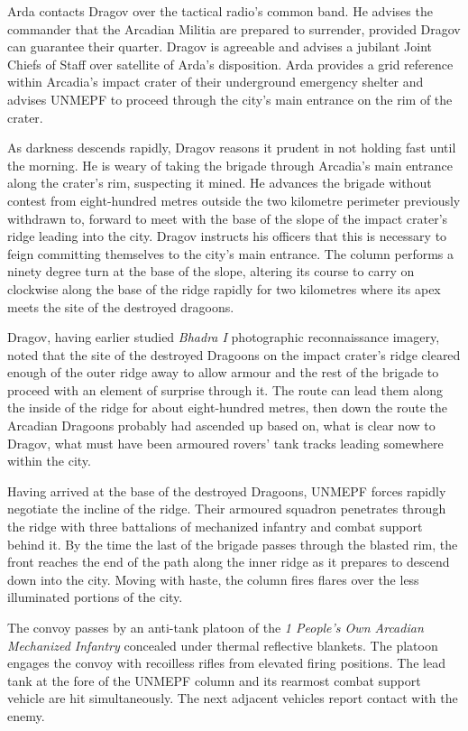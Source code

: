 Arda contacts Dragov over the tactical radio's common band. He advises the commander that the Arcadian Militia are prepared to surrender, provided Dragov can guarantee their quarter. Dragov is agreeable and advises a jubilant Joint Chiefs of Staff over satellite of Arda's disposition. Arda provides a grid reference within Arcadia's impact crater of their underground emergency shelter and advises UNMEPF to proceed through the city's main entrance on the rim of the crater. 

As darkness descends rapidly, Dragov reasons it prudent in not holding fast until the morning. He is weary of taking the brigade through Arcadia's main entrance along the crater's rim, suspecting it mined. He advances the brigade without contest from eight-hundred metres outside the two kilometre perimeter previously withdrawn to, forward to meet with the base of the slope of the impact crater's ridge leading into the city. Dragov instructs his officers that this is necessary to feign committing themselves to the city's main entrance. The column performs a ninety degree turn at the base of the slope, altering its course to carry on clockwise along the base of the ridge rapidly for two kilometres where its apex meets the site of the destroyed dragoons.

Dragov, having earlier studied {\it Bhadra I} photographic reconnaissance imagery, noted that the site of the destroyed Dragoons on the impact crater's ridge cleared enough of the outer ridge away to allow armour and the rest of the brigade to proceed with an element of surprise through it. The route can lead them along the inside of the ridge for about eight-hundred metres, then down the route the Arcadian Dragoons probably had ascended up based on, what is clear now to Dragov, what must have been armoured rovers' tank tracks leading somewhere within the city.

Having arrived at the base of the destroyed Dragoons, UNMEPF forces rapidly negotiate the incline of the ridge. Their armoured squadron penetrates through the ridge with three battalions of mechanized infantry and combat support behind it. By the time the last of the brigade passes through the blasted rim, the front reaches the end of the path along the inner ridge as it prepares to descend down into the city. Moving with haste, the column fires flares over the less illuminated portions of the city. 

The convoy passes by an anti-tank platoon of the {\it 1 People's Own Arcadian Mechanized Infantry} concealed under thermal reflective blankets. The platoon engages the convoy with recoilless rifles from elevated firing positions. The lead tank at the fore of the UNMEPF column and its rearmost combat support vehicle are hit simultaneously. The next adjacent vehicles report contact with the enemy. 

